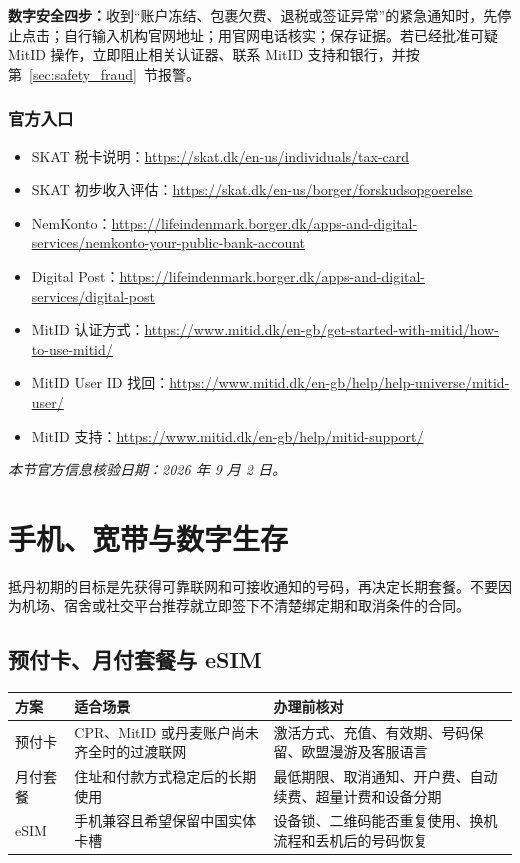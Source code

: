\begin{grayleftbox}
\textbf{数字安全四步：}收到“账户冻结、包裹欠费、退税或签证异常”的紧急通知时，先停止点击；自行输入机构官网地址；用官网电话核实；保存证据。若已经批准可疑 MitID 操作，立即阻止相关认证器、联系 MitID 支持和银行，并按第~\ref{sec:safety_fraud}~节报警。
\end{grayleftbox}

\subsubsection{官方入口}

\begin{itemize}[leftmargin=2em,itemsep=2pt]
  \item SKAT 税卡说明：\url{https://skat.dk/en-us/individuals/tax-card}
  \item SKAT 初步收入评估：\url{https://skat.dk/en-us/borger/forskudsopgoerelse}
  \item NemKonto：\url{https://lifeindenmark.borger.dk/apps-and-digital-services/nemkonto-your-public-bank-account}
  \item Digital Post：\url{https://lifeindenmark.borger.dk/apps-and-digital-services/digital-post}
  \item MitID 认证方式：\url{https://www.mitid.dk/en-gb/get-started-with-mitid/how-to-use-mitid/}
  \item MitID User ID 找回：\url{https://www.mitid.dk/en-gb/help/help-universe/mitid-user/}
  \item MitID 支持：\url{https://www.mitid.dk/en-gb/help/mitid-support/}
\end{itemize}

\noindent\textit{本节官方信息核验日期：2026 年 9 月 2 日。}

\section{手机、宽带与数字生存}\label{sec:connectivity}

抵丹初期的目标是先获得可靠联网和可接收通知的号码，再决定长期套餐。不要因为机场、宿舍或社交平台推荐就立即签下不清楚绑定期和取消条件的合同。

\subsection{预付卡、月付套餐与 eSIM}

\noindent\begin{tabularx}{\textwidth}{@{}p{}X X@{}}
\toprule
\textbf{方案} & \textbf{适合场景} & \textbf{办理前核对} \\
\midrule
预付卡 & CPR、MitID 或丹麦账户尚未齐全时的过渡联网 & 激活方式、充值、有效期、号码保留、欧盟漫游及客服语言 \\
月付套餐 & 住址和付款方式稳定后的长期使用 & 最低期限、取消通知、开户费、自动续费、超量计费和设备分期 \\
eSIM & 手机兼容且希望保留中国实体卡槽 & 设备锁、二维码能否重复使用、换机流程和丢机后的号码恢复 \\
\bottomrule
\end{tabularx}

